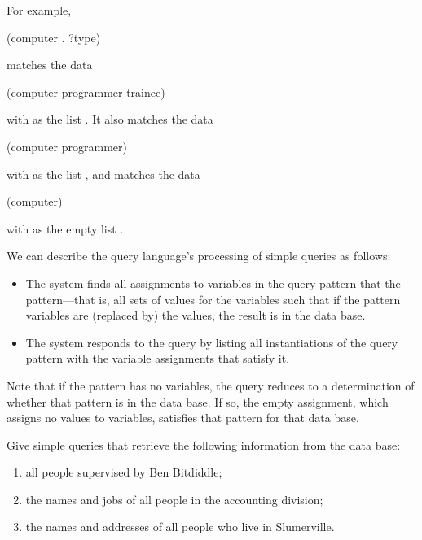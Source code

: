 \noindent
For example,

\begin{codeBlock}
(computer . ?type)
\end{codeBlock}

\noindent
matches the data

\begin{codeBlock}
(computer programmer trainee)
\end{codeBlock}

\noindent
with  as the list .  It also
matches the data

\begin{codeBlock}
(computer programmer)
\end{codeBlock}

\noindent
with  as the list , and matches the data

\begin{codeBlock}
(computer)
\end{codeBlock}

\noindent
with  as the empty list \code{()}.

We can describe the query language's processing of simple queries as follows:

\begin{itemize}
\item
The system finds all assignments to variables in the query pattern that
 the pattern---that is, all sets of values for the variables
such that if the pattern variables are  (replaced
by) the values, the result is in the data base.

\item
The system responds to the query by listing all instantiations of the query
pattern with the variable assignments that satisfy it.
\end{itemize}

\noindent
Note that if the pattern has no variables, the query reduces to a determination
of whether that pattern is in the data base.  If so, the empty assignment,
which assigns no values to variables, satisfies that pattern for that data
base.

\begin{exerciseGroup}
\label{Exercise 4.55}
 Give simple queries that retrieve
the following information from the data base:

\begin{enumerate}

\item
all people supervised by Ben Bitdiddle;

\item
the names and jobs of all people in the accounting division;

\item
the names and addresses of all people who live in Slumerville.

\end{enumerate}
\end{exerciseGroup}

